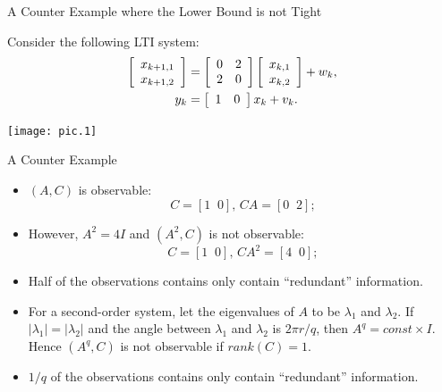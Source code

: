 \documentclass[10pt]{beamer}
\DeclareMathOperator{\1}{\textbf{1}}
\begin{document}
  \begin{frame}{A Counter Example where the Lower Bound is not Tight}

    Consider the following LTI system:
    \begin{displaymath}
      \begin{split}
       \left[ {\begin{array}{*{20}c}
	 x_{k+1,1}  \\
	 x_{k+1,2}
      \end{array}} \right] &=
\left[ {\begin{array}{*{20}c}
	0 & 2  \\
	2 & 0 
      \end{array}} \right]  \left[ {\begin{array}{*{20}c}
	 x_{k,1}  \\
	 x_{k,2}
      \end{array}} \right] + w_k,\\
      y_k &= \left[ {\begin{array}{*{20}c}
	1 & 0 
      \end{array}} \right] x_k + v_k.
      \end{split}
    \end{displaymath}
    \begin{center}
      \texttt{[image: pic.1]}
    \end{center}
  \end{frame}

  \begin{frame}{A Counter Example}
    \begin{itemize} 
      \item $(A,C)$ is observable:
	\begin{displaymath}
	 C = [1\;\;0],\,CA = [0\;\;2]; 
	\end{displaymath}
      \item However, $A^2 =4I$ and $(A^2,C)$ is not observable:
	\begin{displaymath}
	 C = [1\;\;0],\,CA^2 = [4\;\;0]; 
	\end{displaymath}
      \item Half of the observations contains only contain ``redundant'' information.
      \item For a second-order system, let the eigenvalues of $A$ to be $\lambda_1$ and $\lambda_2$. If $|\lambda_1| = |\lambda_2|$ and the angle between $\lambda_1$ and $\lambda_2$ is $2\pi r/q$, then $A^q = const\times I$. Hence $(A^q,C)$ is not observable if $rank(C) = 1$.
      \item $1/q$ of the observations contains only contain ``redundant'' information.
    \end{itemize}
  \end{frame}
\end{document}
